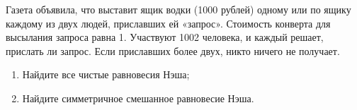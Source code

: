 








\begin{problem}
\begin{source}
\cite{savva:nmu}
\end{source}
Газета объявила, что выставит ящик водки (1000 рублей) одному или по ящику каждому из двух людей, приславших ей «запрос». Стоимость конверта для высылания запроса равна 1. Участвуют 1002 человека, и каждый решает, прислать ли запрос. Если приславших более двух, никто ничего не получает.
\begin{enumerate}
\item Найдите все чистые равновесия Нэша;
\item  Найдите симметричное смешанное равновесие Нэша.
\end{enumerate}


\begin{sol}

\end{sol}
\end{problem}


